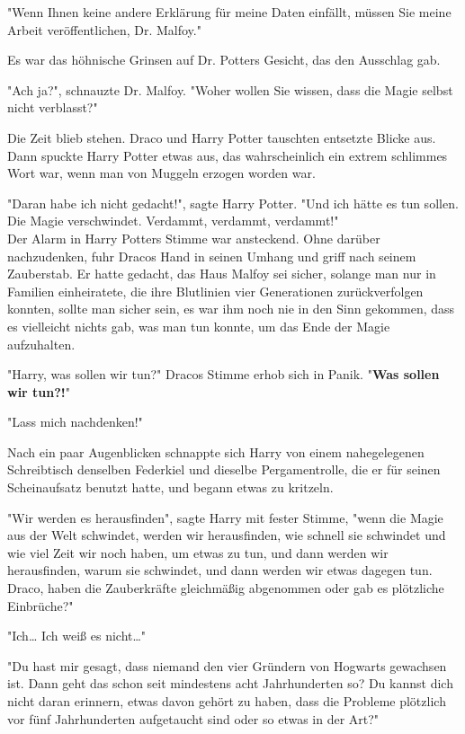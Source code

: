 {"Wenn Ihnen keine andere Erklärung für meine Daten einfällt, müssen Sie meine Arbeit veröffentlichen, Dr. Malfoy."

Es war das höhnische Grinsen auf Dr. Potters Gesicht, das den Ausschlag gab.

"Ach ja?", schnauzte Dr. Malfoy. "Woher wollen Sie wissen, dass die Magie selbst nicht verblasst?"

Die Zeit blieb stehen. Draco und Harry Potter tauschten entsetzte Blicke aus. Dann spuckte Harry Potter etwas aus, das wahrscheinlich ein extrem schlimmes Wort war, wenn man von Muggeln erzogen worden war.

"Daran habe ich nicht gedacht!", sagte Harry Potter. "Und ich hätte es tun sollen. Die Magie verschwindet. Verdammt, verdammt, verdammt!"\\ Der Alarm in Harry Potters Stimme war ansteckend. Ohne darüber nachzudenken, fuhr Dracos Hand in seinen Umhang und griff nach seinem Zauberstab. Er hatte gedacht, das Haus Malfoy sei sicher, solange man nur in Familien einheiratete, die ihre Blutlinien vier Generationen zurückverfolgen konnten, sollte man sicher sein, es war ihm noch nie in den Sinn gekommen, dass es vielleicht nichts gab, was man tun konnte, um das Ende der Magie aufzuhalten.

"Harry, was sollen wir tun?" Dracos Stimme erhob sich in Panik. "\textbf{Was sollen wir tun?!}"

"Lass mich nachdenken!"

Nach ein paar Augenblicken schnappte sich Harry von einem nahegelegenen Schreibtisch denselben Federkiel und dieselbe Pergamentrolle, die er für seinen Scheinaufsatz benutzt hatte, und begann etwas zu kritzeln.

"Wir werden es herausfinden", sagte Harry mit fester Stimme, "wenn die Magie aus der Welt schwindet, werden wir herausfinden, wie schnell sie schwindet und wie viel Zeit wir noch haben, um etwas zu tun, und dann werden wir herausfinden, warum sie schwindet, und dann werden wir etwas dagegen tun. Draco, haben die Zauberkräfte gleichmäßig abgenommen oder gab es plötzliche Einbrüche?"

"Ich… Ich weiß es nicht…"

"Du hast mir gesagt, dass niemand den vier Gründern von Hogwarts gewachsen ist. Dann geht das schon seit mindestens acht Jahrhunderten so? Du kannst dich nicht daran erinnern, etwas davon gehört zu haben, dass die Probleme plötzlich vor fünf Jahrhunderten aufgetaucht sind oder so etwas in der Art?"

}
